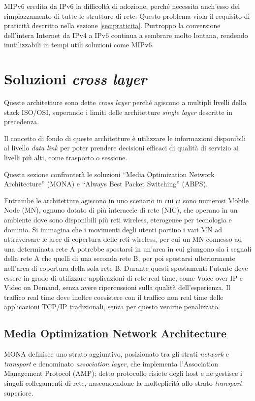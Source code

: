\documentclass[12pt,a4paper,openright,twoside,draft]{book}
\begin{document}
MIPv6 eredita da IPv6 la difficoltà di adozione, perché necessita
anch'esso del rimpiazzamento di tutte le strutture di rete. Questo
problema vìola il requisito di praticità descritto nella sezione
\ref{sec:praticita}. Purtroppo la conversione dell'intera Internet
da IPv4 a IPv6 continua a sembrare molto lontana, rendendo
inutilizzabili in tempi utili soluzioni come MIPv6.

\section{Soluzioni \emph{cross layer}}
Queste architetture sono dette \emph{cross layer} perché agiscono a
multipli livelli dello stack ISO/OSI, superando i limiti delle
architetture \emph{single layer} descritte in precedenza.

Il concetto di fondo di queste architetture è utilizzare le
informazioni disponibili al livello \emph{data link} per poter
prendere decisioni efficaci di qualità di servizio ai livelli più
alti, come trasporto o sessione.

Questa sezione confronterà le soluzioni ``Media Optimization Network
Architecture'' (MONA) e ``Always Best Packet Switching'' (ABPS).

Entrambe le architetture agiscono in uno scenario in cui ci sono
numerosi Mobile Node (MN), ognuno dotato di più interaccie di rete
(NIC), che operano in un ambiente dove sono disponibili più reti
wireless, eterogenee per tecnologia e dominio. Si immagina che i
movimenti degli utenti portino i vari MN ad attraversare le aree di
copertura delle reti wireless, per cui un MN connesso ad una
determinata rete A potrebbe spostarsi in un'area in cui giungono sia i
segnali della rete A che quelli di una seconda rete B, per poi
spostarsi ulteriormente nell'area di copertura della sola rete
B. Durante questi spostamenti l'utente deve essere in grado di
utilizzare applicazioni di rete real time, come Voice over IP e Video
on Demand, senza avere ripercussioni sulla qualità dell'esperienza. Il
traffico real time deve inoltre coesistere con il traffico non real
time delle applicazioni TCP/IP tradizionali, senza per questo venirne
penalizzato.

\subsection{Media Optimization Network Architecture}

MONA definisce uno strato aggiuntivo, posizionato tra gli strati
\emph{network} e \emph{transport} e denominato \emph{association
  layer}, che implementa l'Association Management Protocol (AMP);
detto protocollo risiete degli host e ne gestisce i singoli
collegamenti di rete, nascondendone la molteplicità allo strato
\emph{transport} superiore.
\end{document}
